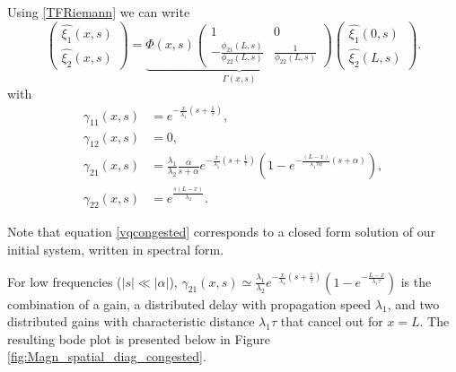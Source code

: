 \documentclass[5p,twocolumn]{elsarticle}
\begin{document}
Using \eqref{TFRiemann} we can write 
\begin{equation} \label{vqcongested}
\begin{pmatrix}
\hat{\xi_{1}}(x,s)\\
\hat{\xi_{2}}(x,s)
\end{pmatrix} = \underbrace{
\Phi(x,s) \begin{pmatrix}
1 & 0\\
-\frac{\phi_{21}\left(L,s\right)}{\phi_{22}\left(L,s\right)} & \frac{1}{\phi_{22}\left(L,s\right)}
\end{pmatrix}}_\text{$\Gamma (x,s)$}
\begin{pmatrix}
\hat{\xi_{1}}\left(0,s\right)\\
\hat{\xi_{2}}\left(L,s\right)
\end{pmatrix}.
\end{equation}
with
\begin{subequations}
\begin{align}
\gamma_{11}\left(x,s\right)&=
e^{-\frac{x}{\lambda_{1}}\left(s+\frac{1}{\tau}\right)},\\
\gamma_{12}\left(x,s\right)&=0,\\
\gamma_{21}\left(x,s\right)&=
\frac{\lambda_{1}}{\lambda_{2}}
\frac{\alpha}{s + \alpha}
e^{-\frac{x}{\lambda_{1}} \left( s + \frac{1}{\tau} \right)}
\left(
	1 -
	e^{-\frac{\left(L - x\right)
		}{
		\lambda_{1}\tau\alpha
		}
		\left(s+\alpha\right)
		}
\right)
,\\
\gamma_{22}\left(x,s\right)&=e^{\frac{s\left(L-x\right)}{\lambda_{2}}}.
\end{align}
\end{subequations}

Note that equation \eqref{vqcongested} corresponds to a closed form solution of our initial system, written in spectral form.

For low frequencies ($\left|s\right|\ll\left|\alpha\right|$), 
$\gamma_{21}\left(x,s\right)
\simeq
\frac{\lambda_{1}}{\lambda_{2}}
e^{-\frac{x}{\lambda_{1}} \left( s + \frac{1}{\tau} \right)}
\left(
	1 -
	e^{-\frac{L-x}{\lambda_{1}\tau}}
\right)
$
is the combination of a gain, a distributed delay with propagation speed $\lambda_{1}$, and two distributed gains with characteristic distance $\lambda_{1}\tau$ that cancel out for $x = L$. The resulting bode plot is presented below in Figure \ref{fig:Magn_spatial_diag_congested}.
\end{document}

